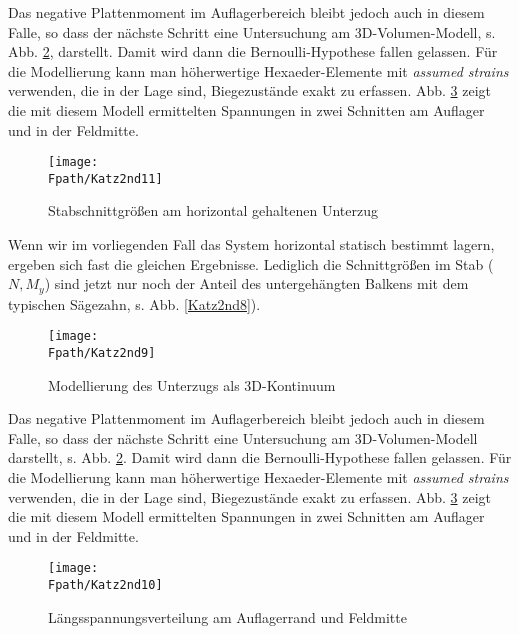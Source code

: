 Das negative Plattenmoment im Auflagerbereich bleibt jedoch auch in diesem Falle, so dass der n\"{a}chste Schritt eine Untersuchung am 3D-Volumen-Modell, s. Abb. \ref{Katz2nd9}, darstellt. Damit wird dann die Bernoulli-Hypothese fallen gelassen. F\"{u}r die Modellierung kann man h\"{o}herwertige Hexaeder-Elemente mit {\em assumed strains\/} verwenden, die in der Lage sind, Biegezust\"{a}nde exakt zu erfassen. Abb. \ref{Katz2nd10} zeigt die mit diesem Modell ermittelten Spannungen in zwei Schnitten am Auflager und in der Feldmitte.
\begin{figure}[tbp] \centering
\centering
\if {} \sidecaption[t] \fi
\texttt{[image: \\Fpath/Katz2nd11]}
\caption{Stabschnittgr\"{o}{\ss}en am horizontal gehaltenen Unterzug} \label{Katz2nd11}
\end{figure}%

Wenn wir im vorliegenden Fall das System horizontal statisch bestimmt lagern, ergeben sich fast die gleichen Ergebnisse. Lediglich die Schnittgr\"{o}{\ss}en im Stab ($N, M_y$) sind jetzt nur noch der Anteil des untergeh\"{a}ngten Balkens mit dem typischen S\"{a}gezahn, s. Abb. \ref{Katz2nd8}).

\begin{figure}[tbp] \centering
\centering
\if {} \sidecaption[t] \fi
\texttt{[image: \\Fpath/Katz2nd9]}
\caption{Modellierung des Unterzugs als 3D-Kontinuum} \label{Katz2nd9}
\end{figure}%

Das negative Plattenmoment im Auflagerbereich bleibt jedoch auch in diesem Falle, so dass der n\"{a}chste Schritt eine Untersuchung am 3D-Volumen-Modell darstellt, s. Abb. \ref{Katz2nd9}. Damit wird dann die Bernoulli-Hypothese fallen gelassen. F\"{u}r die Modellierung kann man h\"{o}herwertige Hexaeder-Elemente mit {\em assumed strains\/} verwenden, die in der Lage sind, Biegezust\"{a}nde exakt zu erfassen. Abb. \ref{Katz2nd10} zeigt die mit diesem Modell ermittelten Spannungen in zwei Schnitten am Auflager und in der Feldmitte.

\begin{figure}[tbp] \centering
\centering
\if {} \sidecaption[t] \fi
\texttt{[image: \\Fpath/Katz2nd10]}
\caption{L\"{a}ngsspannungsverteilung am Auflagerrand und Feldmitte} \label{Katz2nd10}
\end{figure}%




